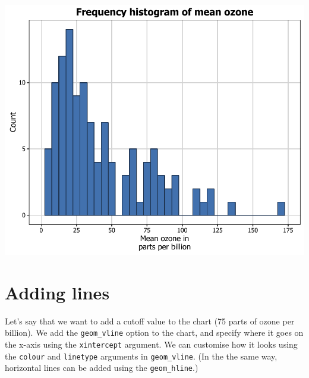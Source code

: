 \begin{center}\includegraphics[width=0.6\linewidth]{7_Histograms_pdf/histogram_17-1} \end{center}

\section{Adding lines}\label{adding-lines}

Let's say that we want to add a cutoff value to the chart (75 parts of
ozone per billion). We add the \texttt{geom\_vline} option to the chart,
and specify where it goes on the x-axis using the \texttt{xintercept}
argument. We can customise how it looks using the \texttt{colour} and
\texttt{linetype} arguments in \texttt{geom\_vline}. (In the the same
way, horizontal lines can be added using the \texttt{geom\_hline}.)

